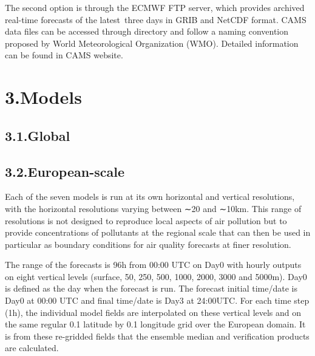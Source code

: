 \documentclass[9pt]{report}
\begin{document}
The second option is through the ECMWF FTP server, which provides archived real-time forecasts of the latest three days in GRIB and NetCDF format.
CAMS data files can be accessed through directory and follow a naming convention proposed by World Meteorological Organization (WMO). 
Detailed information can be found in CAMS website.%

\section{3.\hspace*{0.5em}Models}\label{sec-models}%

\subsection{3.1.\hspace*{0.5em}Global}\label{sec-global}%

\subsection{3.2.\hspace*{0.5em}European-scale}\label{sec-european-scale}%

\noindent{}Each of the seven models is run at its own horizontal and vertical resolutions, with the horizontal resolutions varying between ∼20 and ∼10km. 
This range of resolutions is not designed to reproduce local aspects of air pollution but to provide concentrations of pollutants at the regional scale that can then be used in particular as boundary conditions for air quality forecasts at finer resolution.%

The range of the forecasts is 96h from 00:00 UTC on Day0 with hourly outputs on eight vertical levels (surface, 50, 250, 500, 1000, 2000, 3000 and 5000m). 
Day0 is defined as the day when the forecast is run. 
The forecast initial time/date is Day0 at 00:00 UTC and final time/date is Day3 at 24:00UTC. 
For each time step (1h), the individual model fields are interpolated on these vertical levels and on the same regular 0.1\textdegree{} latitude by 0.1\textdegree{} longitude grid over the European domain. 
It is from these re-gridded fields that the ensemble median and verification products are calculated.%
\end{document}

